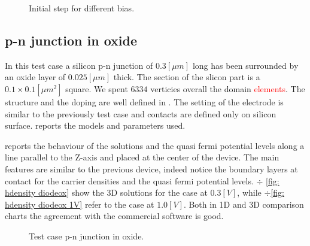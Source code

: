 \begin{figure}[!b]
\centering
{}
\caption{Initial step for different bias.}
\label{fig: different biast initial step}
\end{figure}
 



\clearpage


\subsection{p-n junction in oxide}
\label{sec: PNOX}

In this test case a silicon p-n junction of $0.3[\mu m]$ long has been surrounded by an oxide layer of $0.025[\mu m]$ thick. The section of the slicon part is a $0.1 \times 0.1 [\mu m^2]$ square.  We spent $6334$ verticies overall the domain \textcolor{red}{elements}. The structure and the doping are well defined in . The setting of the electrode is similar to the previously test case and contacts are defined only on silicon surface. 
 reports the models and parameters used.

 reports the behaviour of the solutions and the quasi fermi potential levels along a line parallel to the Z-axis and placed at the center of the device. The main features are similar to the previous device, indeed notice the boundary layers at contact for the carrier densities and the quasi fermi potential levels.
 $\div$ \ref{fig: hdensity diodeox} show the 3D solutions for the case at $0.3[V]$, while $\div$\ref{fig: hdensity diodeox 1V} refer to the case at $1.0[V]$. Both in 1D and 3D comparison charts the agreement with the commercial software is good. 

\vspace{0.5cm}

\begin{figure}[!h]
\centering
{}
\hspace{1.5cm}
\caption{Test case p-n junction in oxide.}
\label{fig: structure diodeox}
\end{figure}


